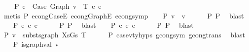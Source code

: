 \begin{isabellebody}
\ \ \ \ P{}{\isacharcolon}{\kern0pt}\ {\isachardoublequoteopen}e{}{\isacharprime}{\kern0pt}\ {\isacharequal}{\kern0pt}\ Case\ {\isacharparenleft}{\kern0pt}Graph\ v{\isacharprime}{\kern0pt}{\isacharparenright}{\kern0pt}\ {\isasymGamma}\ T\ e{}{\isacharprime}{\kern0pt}{\isacharprime}{\kern0pt}\ e{}{\isacharprime}{\kern0pt}{\isacharprime}{\kern0pt}{\isachardoublequoteclose}\isanewline
\ \ \isamarkupfalse%
\ {\isacharparenleft}{\kern0pt}metis\ P{}\ econg{\isacharunderscore}{\kern0pt}CaseE\ econg{\isacharunderscore}{\kern0pt}GraphE\ econg{\isacharunderscore}{\kern0pt}symp{\isacharparenright}{\kern0pt}\isanewline
\isanewline
\ \ \isamarkupfalse%
\ P{}{\isacharcolon}{\kern0pt}\ {\isachardoublequoteopen}v\ {\isasymsimeq}\ v{\isacharprime}{\kern0pt}{\isachardoublequoteclose}\isanewline
\ \ \ \ \isamarkupfalse%
\ P{}\ P{}\ \isamarkupfalse%
\ blast\isanewline
\ \ \isamarkupfalse%
\ P{}{\isacharcolon}{\kern0pt}\ {\isachardoublequoteopen}e{}\ {\isasymsimeq}e\ e{}{\isacharprime}{\kern0pt}{\isacharprime}{\kern0pt}{\isachardoublequoteclose}\isanewline
\ \ \ \ \isamarkupfalse%
\ P{}\ P{}\ \isamarkupfalse%
\ blast\isanewline
\ \ \isamarkupfalse%
\ P{}{\isacharcolon}{\kern0pt}\ {\isachardoublequoteopen}e{}\ {\isasymsimeq}e\ e{}{\isacharprime}{\kern0pt}{\isacharprime}{\kern0pt}{\isachardoublequoteclose}\isanewline
\ \ \ \ \isamarkupfalse%
\ P{}\ P{}\ \isamarkupfalse%
\ blast\isanewline
\isanewline
\ \ \isamarkupfalse%
\ P{}{\isacharcolon}{\kern0pt}\ {\isachardoublequoteopen}v{\isacharprime}{\kern0pt}\ {\isasymsimeq}\ substs{\isacharunderscore}{\kern0pt}graph\ XsGs\ T{\isachardoublequoteclose}\isanewline
\ \ \ \ \isamarkupfalse%
\ P{}\ case{}{\isacharunderscore}{\kern0pt}v{\isacharunderscore}{\kern0pt}ty{\isachardot}{\kern0pt}hyps{\isacharparenleft}{\kern0pt}{}{\isacharparenright}{\kern0pt}\ gcong{\isachardot}{\kern0pt}sym\ gcong{\isachardot}{\kern0pt}trans\ \isamarkupfalse%
\ blast\isanewline
\isanewline
\ \ \isamarkupfalse%
\ P{}{\isacharcolon}{\kern0pt}\ {\isachardoublequoteopen}is{\isacharunderscore}{\kern0pt}graph{\isacharunderscore}{\kern0pt}val\ v{\isacharprime}{\kern0pt}{\isachardoublequoteclose}\isanewline

\end{isabellebody}
